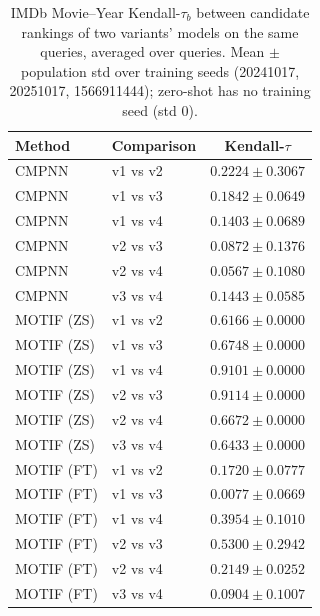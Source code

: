 \documentclass{article}
\begin{document}
\begin{table}[t]
\centering
\small
\begin{tabular}{||l||l||c||}
\hline
\textbf{Method} & \textbf{Comparison} & \textbf{Kendall-$\tau$} \\
\hline\hline
CMPNN & v1 vs v2 & $0.2224 \pm 0.3067$ \\
\hline
CMPNN & v1 vs v3 & $0.1842 \pm 0.0649$ \\
\hline
CMPNN & v1 vs v4 & $0.1403 \pm 0.0689$ \\
\hline
CMPNN & v2 vs v3 & $0.0872 \pm 0.1376$ \\
\hline
CMPNN & v2 vs v4 & $0.0567 \pm 0.1080$ \\
\hline
CMPNN & v3 vs v4 & $0.1443 \pm 0.0585$ \\
\hline
\hline
MOTIF (ZS) & v1 vs v2 & $0.6166 \pm 0.0000$ \\
\hline
MOTIF (ZS) & v1 vs v3 & $0.6748 \pm 0.0000$ \\
\hline
MOTIF (ZS) & v1 vs v4 & $0.9101 \pm 0.0000$ \\
\hline
MOTIF (ZS) & v2 vs v3 & $0.9114 \pm 0.0000$ \\
\hline
MOTIF (ZS) & v2 vs v4 & $0.6672 \pm 0.0000$ \\
\hline
MOTIF (ZS) & v3 vs v4 & $0.6433 \pm 0.0000$ \\
\hline
\hline
MOTIF (FT) & v1 vs v2 & $0.1720 \pm 0.0777$ \\
\hline
MOTIF (FT) & v1 vs v3 & $0.0077 \pm 0.0669$ \\
\hline
MOTIF (FT) & v1 vs v4 & $0.3954 \pm 0.1010$ \\
\hline
MOTIF (FT) & v2 vs v3 & $0.5300 \pm 0.2942$ \\
\hline
MOTIF (FT) & v2 vs v4 & $0.2149 \pm 0.0252$ \\
\hline
MOTIF (FT) & v3 vs v4 & $0.0904 \pm 0.1007$ \\
\hline
\end{tabular}
\caption{IMDb Movie--Year Kendall-$\tau_b$ between candidate rankings of two variants' models on the same queries, averaged over queries. Mean $\pm$ population std over training seeds (20241017, 20251017, 1566911444); zero-shot has no training seed (std 0). }
\label{tab:imdb_movie_year_seed_invariance}
\end{table}
\end{document}

